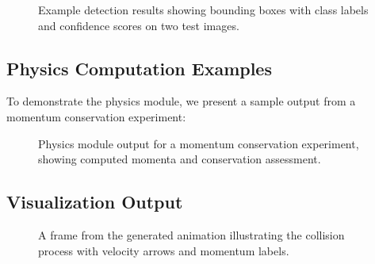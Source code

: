 \documentclass[12pt]{article}
\begin{document}
\begin{figure}[H]
  \centering
  \hfill
  \caption{Example detection results showing bounding boxes with class labels and confidence scores on two test images.}
  \label{fig:detection_examples}
\end{figure}

\subsection{Physics Computation Examples}

To demonstrate the physics module, we present a sample output from a momentum conservation experiment:

\begin{figure}[H]
  \centering
  \caption{Physics module output for a momentum conservation experiment, showing computed momenta and conservation assessment.}
  \label{fig:physics_output}
\end{figure}

\subsection{Visualization Output}

\begin{figure}[H]
  \centering
  \caption{A frame from the generated animation illustrating the collision process with velocity arrows and momentum labels.}
  \label{fig:animation}
\end{figure}
\end{document}
